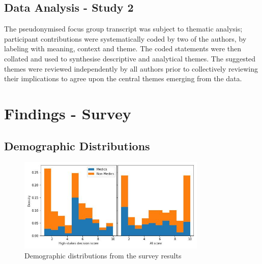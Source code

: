 \documentclass[manuscript,screen,review]{acmart}
\begin{document}
\subsection{Data Analysis - Study 2}
\label{study2_data_analysis}

The pseudonymised focus group transcript was subject to thematic analysis; participant contributions were systematically coded by two of the authors, by labeling with meaning, context and theme. The coded statements were then collated and used to synthesise descriptive and analytical themes. The suggested themes were reviewed independently by all authors prior to collectively reviewing their implications to agree upon the central themes emerging from the data.    



\newpage
\section{Findings - Survey}

\subsection{Demographic Distributions}

\begin{figure}[h]
    \centering
    \includegraphics[width = 0.8\textwidth]{graphics/distributions.jpg}
    \caption{Demographic distributions from the survey results}
    \label{fig:distributions}
\end{figure}



\end{document}
